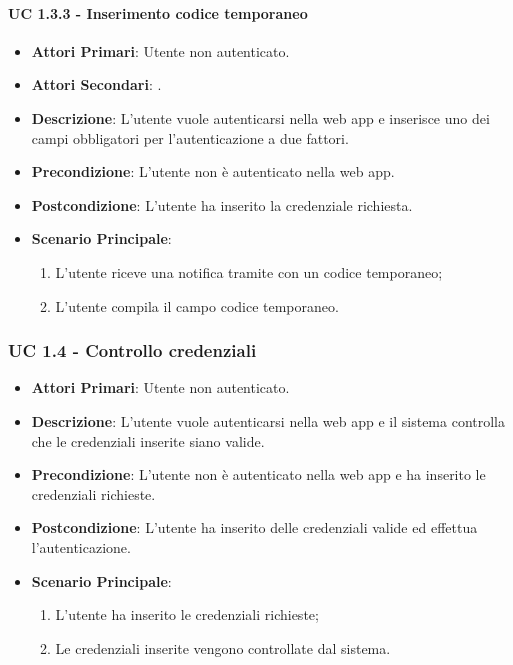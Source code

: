 			\paragraph{UC 1.3.3 - Inserimento codice temporaneo}
			\begin{itemize}
				\item \textbf{Attori Primari}: Utente non autenticato.
				\item \textbf{Attori Secondari}: .
				\item \textbf{Descrizione}: L'utente vuole autenticarsi nella web app e inserisce uno dei campi obbligatori per l'autenticazione a due fattori.
				\item \textbf{Precondizione}: L'utente non è autenticato nella web app.
				\item \textbf{Postcondizione}: L'utente ha inserito la credenziale richiesta.
				\item \textbf{Scenario Principale}:
				\begin{enumerate}
					\item L'utente riceve una notifica tramite  con un codice temporaneo;
					\item L'utente compila il campo codice temporaneo.
				\end{enumerate}	
			\end{itemize}

		\subsubsection{UC 1.4 - Controllo credenziali}
		\begin{itemize}
			\item \textbf{Attori Primari}: Utente non autenticato.
			\item \textbf{Descrizione}: L'utente vuole autenticarsi nella web app e il sistema controlla che le credenziali inserite siano valide.
			\item \textbf{Precondizione}: L'utente non è autenticato nella web app e ha inserito le credenziali richieste.
			\item \textbf{Postcondizione}: L'utente ha inserito delle credenziali valide ed effettua l'autenticazione.
			\item \textbf{Scenario Principale}:
			\begin{enumerate}
				\item L'utente ha inserito le credenziali richieste;
				\item Le credenziali inserite vengono controllate dal sistema.
			\end{enumerate}	
		\end{itemize}

